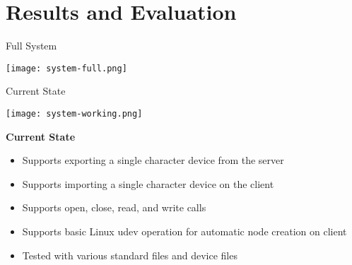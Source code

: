 \documentclass[handout]{beamer}
\begin{document}


\section{Results and Evaluation}
\begin{frame}[c]{Full System}
  \begin{center}
    \texttt{[image: system-full.png]}
  \end{center}
\end{frame}

\begin{frame}[c]{Current State}
  \begin{center}
    \texttt{[image: system-working.png]}
  \end{center}
\end{frame}

\begin{frame}{\bf Current State}

  \begin{itemize}
  \item<1-> Supports exporting a single character device from the server
  \item<2-> Supports importing a single character device on the client
  \item<3-> Supports open, close, read, and write calls
  \item<4-> Supports basic Linux udev operation for automatic node
    creation on client
  \item<5-> Tested with various standard files and device files
  \end{itemize}

\end{frame}
\end{document}
